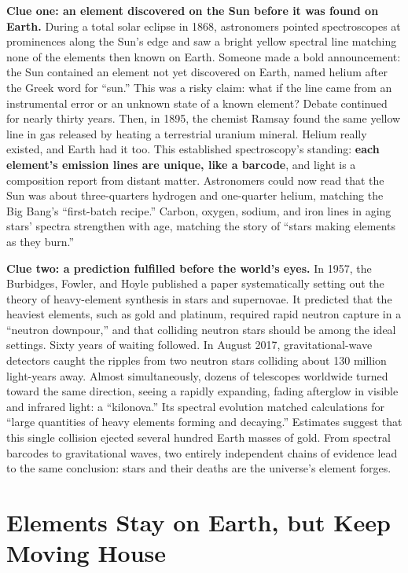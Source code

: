 \begin{zhengju}
\textbf{Clue one: an element discovered on the Sun before it was found on Earth.} During a total solar eclipse in 1868, astronomers pointed spectroscopes at prominences along the Sun's edge and saw a bright yellow spectral line matching none of the elements then known on Earth. Someone made a bold announcement: the Sun contained an element not yet discovered on Earth, named helium after the Greek word for ``sun.'' This was a risky claim: what if the line came from an instrumental error or an unknown state of a known element? Debate continued for nearly thirty years. Then, in 1895, the chemist Ramsay found the same yellow line in gas released by heating a terrestrial uranium mineral. Helium really existed, and Earth had it too. This established spectroscopy's standing: \textbf{each element's emission lines are unique, like a barcode}, and light is a composition report from distant matter. Astronomers could now read that the Sun was about three-quarters hydrogen and one-quarter helium, matching the Big Bang's ``first-batch recipe.'' Carbon, oxygen, sodium, and iron lines in aging stars' spectra strengthen with age, matching the story of ``stars making elements as they burn.''

\textbf{Clue two: a prediction fulfilled before the world's eyes.} In 1957, the Burbidges, Fowler, and Hoyle published a paper systematically setting out the theory of heavy-element synthesis in stars and supernovae. It predicted that the heaviest elements, such as gold and platinum, required rapid neutron capture in a ``neutron downpour,'' and that colliding neutron stars should be among the ideal settings. Sixty years of waiting followed. In August 2017, gravitational-wave detectors caught the ripples from two neutron stars colliding about 130 million light-years away. Almost simultaneously, dozens of telescopes worldwide turned toward the same direction, seeing a rapidly expanding, fading afterglow in visible and infrared light: a ``kilonova.'' Its spectral evolution matched calculations for ``large quantities of heavy elements forming and decaying.'' Estimates suggest that this single collision ejected several hundred Earth masses of gold. From spectral barcodes to gravitational waves, two entirely independent chains of evidence lead to the same conclusion: stars and their deaths are the universe's element forges.
\end{zhengju}

\section{Elements Stay on Earth, but Keep Moving House}

